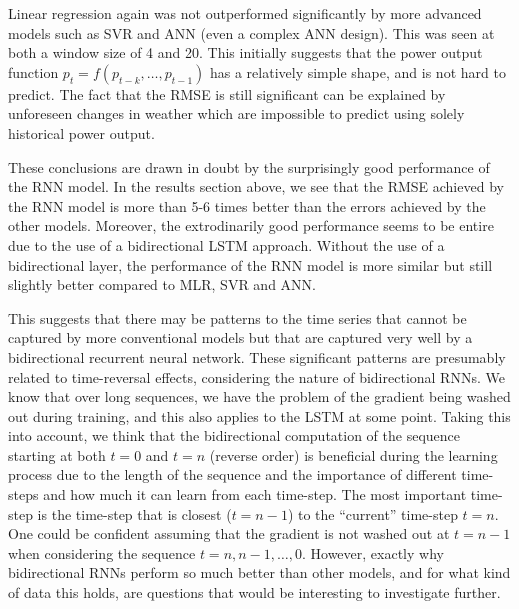\documentclass[11pt]{article}
\begin{document}
Linear regression again was not outperformed significantly by more advanced models such as SVR and ANN (even a complex ANN design).
This was seen at both a window size of 4 and 20.
This initially suggests that the power output function $p_t = f(p_{t-k}, \dots, p_{t-1})$ has a relatively simple shape, and is not hard to predict.
The fact that the RMSE is still significant can be explained by unforeseen changes in weather which are impossible to predict using solely historical power output.

These conclusions are drawn in doubt by the surprisingly good performance of the RNN model.
In the results section above, we see that the RMSE achieved by the RNN model is more than 5-6 times better than the errors achieved by the other models.
Moreover, the extrodinarily good performance seems to be entire due to the use of a bidirectional LSTM approach.
Without the use of a bidirectional layer, the performance of the RNN model is more similar but still slightly better compared to MLR, SVR and ANN.

This suggests that there may be patterns to the time series that cannot be captured by more conventional models but that are captured very well by a bidirectional recurrent neural network.
These significant patterns are presumably related to time-reversal effects, considering the nature of bidirectional RNNs. We know that over long sequences, we have the problem of the gradient being washed out during training, and this also applies to the LSTM at some point. Taking this into account, we think that the bidirectional computation of the sequence starting at both $t = 0$ and $t = n$ (reverse order) is beneficial during the learning process due to the length of the sequence and the importance of different time-steps and how much it can learn from each time-step. The most important time-step is the time-step that is closest ($t = n-1$) to the ``current'' time-step $t = n$. One could be confident assuming that the gradient is not washed out at $t = n-1$ when considering the sequence $t = n, n-1, \dots, 0$. However, exactly why bidirectional RNNs perform so much better than other models, and for what kind of data this holds, are questions that would be interesting to investigate further.


\printbibliography
\end{document}

